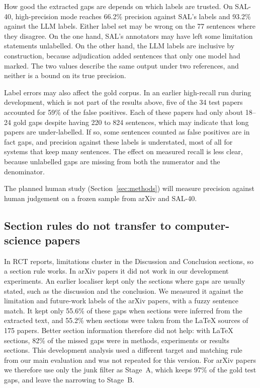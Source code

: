 How good the extracted gaps are depends on which labels are trusted. On SAL-40, high-precision mode reaches 66.2\% precision against SAL's labels and 93.2\% against the LLM labels. Either label set may be wrong on the 77 sentences where they disagree. On the one hand, SAL's annotators may have left some limitation statements unlabelled. On the other hand, the LLM labels are inclusive by construction, because adjudication added sentences that only one model had marked. The two values describe the same output under two references, and neither is a bound on its true precision.

Label errors may also affect the gold corpus. In an earlier high-recall run during development, which is not part of the results above, five of the 34 test papers accounted for 59\% of the false positives. Each of these papers had only about 18--24 gold gaps despite having 220 to 824 sentences, which may indicate that long papers are under-labelled. If so, some sentences counted as false positives are in fact gaps, and precision against these labels is understated, most of all for systems that keep many sentences. The effect on measured recall is less clear, because unlabelled gaps are missing from both the numerator and the denominator.

The planned human study (Section~\ref{sec:methods}) will measure precision against human judgement on a frozen sample from arXiv and SAL-40.

\subsection{Section rules do not transfer to computer-science papers}
\label{sec:localisation}

In RCT reports, limitations cluster in the Discussion and Conclusion sections, so a section rule works. In arXiv papers it did not work in our development experiments. An earlier localiser kept only the sections where gaps are usually stated, such as the discussion and the conclusion. We measured it against the limitation and future-work labels of the arXiv papers, with a fuzzy sentence match. It kept only 55.6\% of these gaps when sections were inferred from the extracted text, and 55.2\% when sections were taken from the LaTeX sources of 175 papers. Better section information therefore did not help: with LaTeX sections, 82\% of the missed gaps were in methods, experiments or results sections. This development analysis used a different target and matching rule from our main evaluation and was not repeated for this version. For arXiv papers we therefore use only the junk filter as Stage~A, which keeps 97\% of the gold test gaps, and leave the narrowing to Stage~B.


